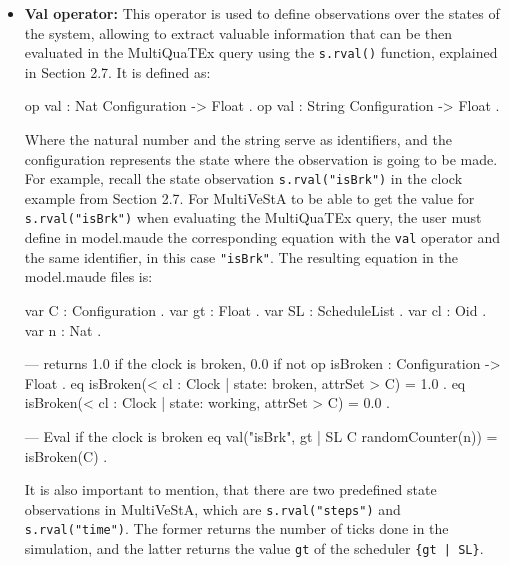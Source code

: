 \begin{itemize}
\item \textbf{Val operator:} This operator is used to define observations over the states of the system, allowing to extract valuable information that can be then evaluated in the MultiQuaTEx query using the \texttt{s.rval()} function, explained in Section 2.7. It is defined as:
\begin{maude}

op val : Nat Configuration -> Float .
op val : String Configuration -> Float . \end{maude}
Where the natural number and the string serve as identifiers, and the configuration represents the state where the observation is going to be made. For example, recall the state observation \texttt{s.rval("isBrk")} in the clock example from Section 2.7. For MultiVeStA to be able to get the value for \texttt{s.rval("isBrk")} when evaluating the MultiQuaTEx query, the user must define in model.maude the corresponding equation with the \texttt{val} operator and the same identifier, in this case \texttt{"isBrk"}. The resulting equation in the model.maude files is:
\begin{maude}

var C : Configuration .
var gt : Float .
var SL : ScheduleList .
var cl : Oid .
var n : Nat .

--- returns 1.0 if the clock is broken, 0.0 if not
op isBroken : Configuration -> Float .
eq isBroken(< cl : Clock | state: broken, attrSet > C) = 1.0 .
eq isBroken(< cl : Clock | state: working, attrSet > C) = 0.0 .

--- Eval if the clock is broken
eq val("isBrk", {gt | SL} {C randomCounter(n)}) = isBroken(C) .\end{maude}

It is also important to mention, that there are two predefined state observations in MultiVeStA, which are \texttt{s.rval("steps")} and \texttt{s.rval("time")}. The former returns the number of ticks done in the simulation, and the latter returns the value \texttt{gt} of the scheduler \texttt{\{gt | SL\}}.
\end{itemize}

